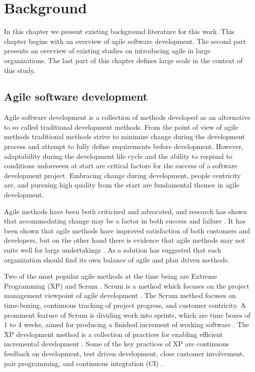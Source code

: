\clearpage

\chapter{Background}
\label{sec:background}

In this chapter we present existing background literature for this work. This
chapter begins with an overview of agile software development. The second
part presents an overview of existing studies on introducing agile in large
organizations. The last part of this chapter defines large scale in the context
of this study.

\section{Agile software development}

Agile software development is a collection of methods developed as an alternative
to so called traditional development methods. From the point of view of agile
methods traditional methods strive to minimize change during the development
process and attempt to fully define requirements before development. However,
adaptability during the development life cycle and the ability to respond to
conditions unforeseen at start are critical factors for the success of a
software development project. Embracing change during development, people
centricity are, and pursuing high quality from the start are fundamental themes
in agile development.
\citep{Highsmith2001,Cockburn2001}

Agile methods have been both criticized and advocated, and research has shown
that accommodating change may be a factor in both success and failure
\citep{Boehm2002}. It has been shown that agile methods have improved
satisfaction of both customers and developers, but on the other hand there is
evidence that agile methods may not suite well for large undertakings
\citep{Dyba2009}. As a solution \citet{Boehm2002} has suggested that each
organization should find its own balance of agile and plan driven methods.

Two of the most popular agile methods at the time being are Extreme Programming
(XP) and Scrum \citep{Hamed2013}. Scrum is a method which focuses on the project
management viewpoint of agile development \citep{Schwaber2002}. The Scrum method
focuses on time-boxing, continuous tracking of project progress, and customer
centricity. A prominent feature of Scrum is dividing work into sprints, which
are time boxes of 1 to 4 weeks, aimed for producing a finished increment of
working software \citep{Schwaber2002}. The XP development method is a collection
of practices for enabling efficient incremental development \citep{Beck1999}.
Some of the key practices of XP are continuous feedback on development, test
driven development, close customer involvement, pair programming, and continuous
integration (CI) \citep{Beck1999}.

